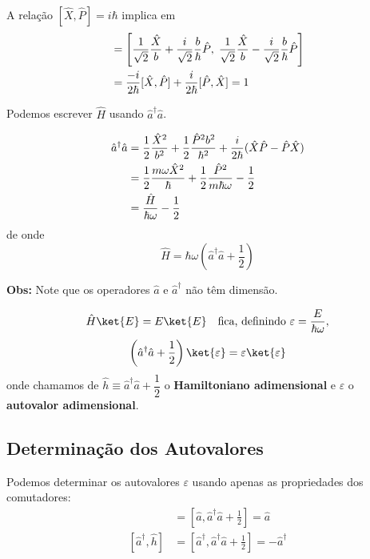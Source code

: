 A relação $[\hat{X}, \hat{P}] = i\hbar$ implica em
\begin{align}
    [\hat{a}, \hat{a}^\dagger] &= \left[ \frac{1}{\sqrt{2}}\frac{\hat{X}}{b} + \frac{i}{\sqrt{2}}\frac{b}{\hbar}\hat{P} , \; \frac{1}{\sqrt{2}}\frac{\hat{X}}{b} - \frac{i}{\sqrt{2}}\frac{b}{\hbar}\hat{P} \right] \notag \\
    &= \frac{-i}{2\hbar}[\hat{X}, \hat{P}] + \frac{i}{2\hbar}[\hat{P}, \hat{X}] = 1
\label{eq:aula18_comutador_a_adagger}
\end{align}

Podemos escrever $\hat{H}$ usando $\hat{a}^\dagger\hat{a}$.

\begin{align}
    \hat{a}^\dagger \hat{a} &= \frac{1}{2}\frac{\hat{X}^2}{b^2} + \frac{1}{2}\frac{\hat{P}^2 b^2}{\hbar^2} + \frac{i}{2\hbar}(\hat{X}\hat{P} - \hat{P}\hat{X}) \notag \\
    &= \frac{1}{2}\frac{m\omega \hat{X}^2}{\hbar} + \frac{1}{2}\frac{\hat{P}^2}{m\hbar\omega} - \frac{1}{2} \notag \\
    &= \frac{\hat{H}}{\hbar\omega} - \frac{1}{2}
\label{eq:aula18_adagger_a_H}
\end{align}
de onde
\begin{equation}
    \boxed{\hat{H} = \hbar\omega\left( \hat{a}^\dagger\hat{a} + \frac{1}{2} \right)}
\label{eq:aula18_H_em_a}
\end{equation}

\textbf{Obs:} Note que os operadores $\hat{a}$ e $\hat{a}^\dagger$ não têm dimensão.

\begin{equation}
    \hat{H}\ket{E} = E\ket{E} \quad \text{fica, definindo } \varepsilon = \frac{E}{\hbar\omega},
\label{eq:aula18_H_autoval}
\end{equation}
\begin{equation}
    \left( \hat{a}^\dagger\hat{a} + \frac{1}{2} \right)\ket{\varepsilon} = \varepsilon\ket{\varepsilon}
\label{eq:aula18_h_adimensional}
\end{equation}
onde chamamos de $\hat{h} \equiv \hat{a}^\dagger\hat{a} + \dfrac{1}{2}$ o \textbf{Hamiltoniano adimensional} e $\varepsilon$ o \textbf{autovalor adimensional}.

\subsection*{Determinação dos Autovalores}

Podemos determinar os autovalores $\varepsilon$ usando apenas as propriedades dos comutadores:
\begin{align}
    [\hat{a}, \hat{h}] &= \left[ \hat{a}, \hat{a}^\dagger\hat{a} + \frac{1}{2} \right] = \hat{a} \label{eq:aula18_a_h_comm} \\
    [\hat{a}^\dagger, \hat{h}] &= \left[ \hat{a}^\dagger, \hat{a}^\dagger\hat{a} + \frac{1}{2} \right] = -\hat{a}^\dagger \label{eq:aula18_adagger_h_comm}
\end{align}

